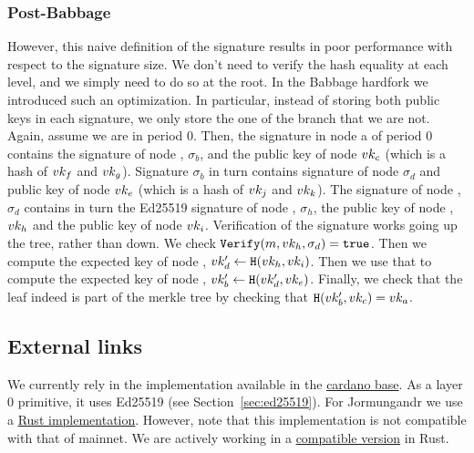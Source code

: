 \subsubsection{Post-Babbage}
However, this naive definition of the signature results in poor performance with respect to the signature size. We don't need to verify the hash equality at each level, and we simply need to do so at the root. In the Babbage hardfork we introduced such an optimization. In particular, instead of storing both public keys in each signature, we only store the one of the branch that we are not. Again, assume we are in period 0. Then, the signature in node a of period 0 contains the signature of node , $\sigma_b$, and the public key of node  $vk_c$ (which is a hash of $vk_f$ and $vk_g$). Signature $\sigma_b$ in turn contains signature of node  $\sigma_d$ and public key of node  $vk_e$ (which is a hash of $vk_j$ and $vk_k$). The signature of node , $\sigma_d$ contains in turn the Ed25519 signature of node , $\sigma_h$, the public key of node , $vk_h$ and the public key of node  $vk_i$. Verification of the signature works going up the tree, rather than down. We check $\texttt{Verify}(m, vk_h, \sigma_d) = \texttt{true}$. Then we compute the expected key of node , $vk_d'\gets\texttt{H}(vk_h, vk_i)$. Then we use that to compute the expected key of node , $vk_b'\gets\texttt{H}(vk_d', vk_e)$. Finally, we check that the leaf indeed is part of the merkle tree by checking that $\texttt{H}(vk_b', vk_c) = vk_a$.
\subsection{External links}
We currently rely in the implementation available in the \href{https://github.com/input-output-hk/cardano-base/tree/master/cardano-crypto-class/src/Cardano/Crypto/KES}{cardano base}. As a layer 0 primitive, it uses Ed25519 (see Section~\ref{sec:ed25519}). For Jormungandr we use a \href{https://github.com/input-output-hk/chain-libs/tree/master/chain-crypto/src/algorithms/sumed25519}{Rust implementation}. However, note that this implementation is not compatible with that of mainnet. We are actively working in a \href{https://github.com/input-output-hk/kes-mmm-sumed25519/tree/crate_review}{compatible version} in Rust. 

